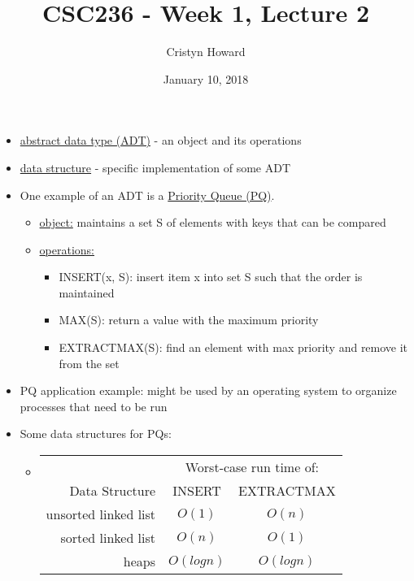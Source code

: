 \documentclass[11pt, oneside]{article}
\title{CSC236 - Week 1, Lecture 2}
\author{Cristyn Howard}
\date{January 10, 2018}
\begin{document}
\maketitle


\begin{itemize}
	\item \underline{abstract data type (ADT)} - an object and its operations
	
	\item \underline{data structure} - specific implementation of some ADT
	\newline
	
	\item One example of an ADT is a \underline{Priority Queue (PQ)}.
		\begin{itemize}
		\item \underline{object:} maintains a set S of elements with keys that can be compared
		
		\item \underline{operations:}
			\begin{itemize}
			\item INSERT(x, S): insert item x into set S such that the order is maintained
			
			\item MAX(S): return a value with the maximum priority
			
			\item EXTRACTMAX(S): find an element with max priority and remove it from the set
			\end{itemize}
		\end{itemize}
		
	\item PQ application example: might be used by an operating system to organize processes that need to be run
	
	\item Some data structures for PQs:
		\begin{itemize}
		\item \begin{tabular}{ |r|c|c| } 
			\hline
			 & \multicolumn{2}{|c|}{Worst-case run time of:} \\
			Data Structure & INSERT & EXTRACTMAX \\
			\hline
			unsorted linked list 	&	 $O(1)$	 	&	 $O(n)$		\\ 
			sorted linked list 	&	 $O(n)$ 		& 	$O(1)$ 		\\ 
	 		heaps 			&	 $O(logn)$ 	& 	$O(logn)$ 	\\ 
			\hline
			\end{tabular}
			

\end{itemize}
\end{itemize}
\end{document}
